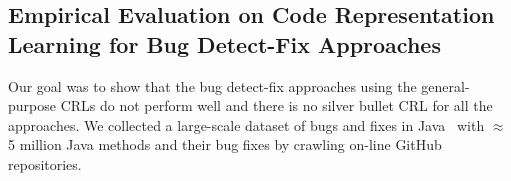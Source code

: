 




\vspace{-5pt}
\subsection{Empirical Evaluation on Code Representation Learning for Bug Detect-Fix Approaches}

\label{prelim-study:sec}

Our goal was to show that the bug detect-fix approaches using the
general-purpose CRLs do not perform well and there is no silver
bullet CRL for all the approaches. We collected a large-scale dataset
of bugs and fixes in Java~\cite{yioopsla19} with $\approx$5 million
Java methods and their bug fixes by crawling on-line GitHub
repositories.




